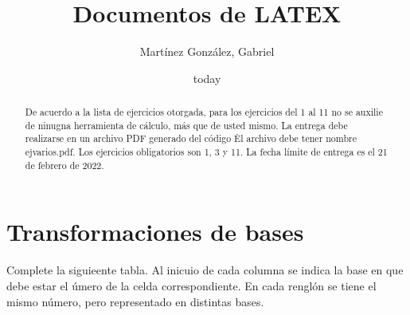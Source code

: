 \documentclass[12pt]{article}
\author{Mart\'{i}nez Gonz\'alez, Gabriel}
\date{today}
\title{Documentos de LATEX}
\begin{document}
\maketitle

\begin{abstract}

	De acuerdo a la lista de ejercicios otorgada, para los ejercicios del 1 al 11 no se auxilie de ninugna herramienta de c\'alculo, m\'as que de usted mismo. La entrega debe realizarse en un archivo PDF generado del c\'odigo \LATEX\. El archivo debe tener nombre ejvarios.pdf. Los ejercicios obligatorios son 1, 3 y 11. La fecha límite de entrega es el 21 de febrero de 2022.

\end{abstract}

\section{Transformaciones de bases}

Complete la siguieente tabla. Al inicuio de cada columna se indica la base en que debe estar el \'umero de la celda correspondiente. En cada rengl\'on se tiene el mismo n\'umero, pero representado en distintas bases.
\end{document}
